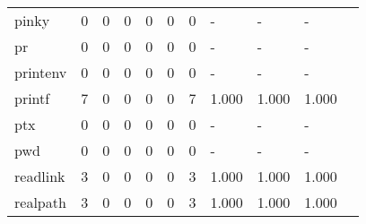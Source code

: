 \begin{longtable}{lp{1.10cm}p{1.10cm}p{1.10cm}p{1.10cm}p{1.10cm}p{1.10cm}p{1.10cm}p{1.10cm}p{1.10cm}p{1.10cm}}
pinky     &                      0 &                                  0 &                                 0 &                                0 &                                 0 &                               0 &                              - &                                     - &                                   - \\
pr        &                      0 &                                  0 &                                 0 &                                0 &                                 0 &                               0 &                              - &                                     - &                                   - \\
printenv  &                      0 &                                  0 &                                 0 &                                0 &                                 0 &                               0 &                              - &                                     - &                                   - \\
printf    &                      7 &                                  0 &                                 0 &                                0 &                                 0 &                               7 &                          1.000 &                                 1.000 &                               1.000 \\
ptx       &                      0 &                                  0 &                                 0 &                                0 &                                 0 &                               0 &                              - &                                     - &                                   - \\
pwd       &                      0 &                                  0 &                                 0 &                                0 &                                 0 &                               0 &                              - &                                     - &                                   - \\
readlink  &                      3 &                                  0 &                                 0 &                                0 &                                 0 &                               3 &                          1.000 &                                 1.000 &                               1.000 \\
realpath  &                      3 &                                  0 &                                 0 &                                0 &                                 0 &                               3 &                          1.000 &                                 1.000 &                               1.000 \\

\end{longtable}
